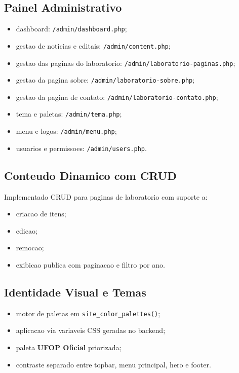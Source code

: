 \documentclass[12pt,a4paper]{article}
\begin{document}
\subsection{Painel Administrativo}
\begin{itemize}
\item dashboard: \texttt{/admin/dashboard.php};
\item gestao de noticias e editais: \texttt{/admin/content.php};
\item gestao das paginas do laboratorio: \texttt{/admin/laboratorio-paginas.php};
\item gestao da pagina sobre: \texttt{/admin/laboratorio-sobre.php};
\item gestao da pagina de contato: \texttt{/admin/laboratorio-contato.php};
\item tema e paletas: \texttt{/admin/tema.php};
\item menu e logos: \texttt{/admin/menu.php};
\item usuarios e permissoes: \texttt{/admin/users.php}.
\end{itemize}

\subsection{Conteudo Dinamico com CRUD}
Implementado CRUD para paginas de laboratorio com suporte a:
\begin{itemize}
\item criacao de itens;
\item edicao;
\item remocao;
\item exibicao publica com paginacao e filtro por ano.
\end{itemize}

\subsection{Identidade Visual e Temas}
\begin{itemize}
\item motor de paletas em \texttt{site\_color\_palettes()};
\item aplicacao via variaveis CSS geradas no backend;
\item paleta \textbf{UFOP Oficial} priorizada;
\item contraste separado entre topbar, menu principal, hero e footer.
\end{itemize}
\end{document}
